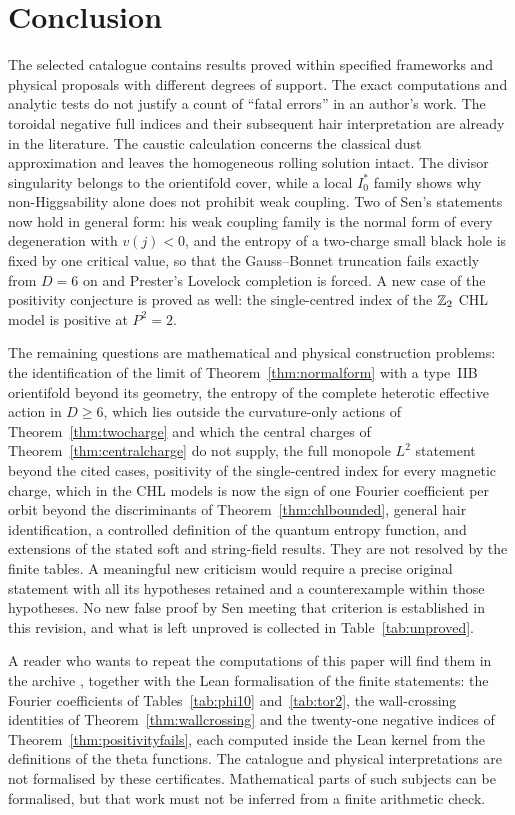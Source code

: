 \section{Conclusion}\label{sec:conclusion}

The selected catalogue contains results proved within specified frameworks and physical proposals with different degrees of support. The exact computations and analytic tests do not justify a count of ``fatal errors'' in an author's work. The toroidal negative full indices and their subsequent hair interpretation are already in the literature. The caustic calculation concerns the classical dust approximation and leaves the homogeneous rolling solution intact. The divisor singularity belongs to the orientifold cover, while a local $I_0^*$ family shows why non-Higgsability alone does not prohibit weak coupling. Two of Sen's statements now hold in general form: his weak coupling family is the normal form of every degeneration with $v(j)<0$, and the entropy of a two-charge small black hole is fixed by one critical value, so that the Gauss--Bonnet truncation fails exactly from $D=6$ on and Prester's Lovelock completion is forced. A new case of the positivity conjecture is proved as well: the single-centred index of the $\mathbb{Z}_2$ CHL model is positive at $P^2=2$.

The remaining questions are mathematical and physical construction problems: the identification of the limit of Theorem~\ref{thm:normalform} with a type~IIB orientifold beyond its geometry, the entropy of the complete heterotic effective action in $D\ge6$, which lies outside the curvature-only actions of Theorem~\ref{thm:twocharge} and which the central charges of Theorem~\ref{thm:centralcharge} do not supply, the full monopole $L^2$ statement beyond the cited cases, positivity of the single-centred index for every magnetic charge, which in the CHL models is now the sign of one Fourier coefficient per orbit beyond the discriminants of Theorem~\ref{thm:chlbounded}, general hair identification, a controlled definition of the quantum entropy function, and extensions of the stated soft and string-field results. They are not resolved by the finite tables. A meaningful new criticism would require a precise original statement with all its hypotheses retained and a counterexample within those hypotheses. No new false proof by Sen meeting that criterion is established in this revision, and what is left unproved is collected in Table~\ref{tab:unproved}.

A reader who wants to repeat the computations of this paper will find them in the archive \cite{Bha26}, together with the Lean formalisation of the finite statements: the Fourier coefficients of Tables~\ref{tab:phi10} and~\ref{tab:tor2}, the wall-crossing identities of Theorem~\ref{thm:wallcrossing} and the twenty-one negative indices of Theorem~\ref{thm:positivityfails}, each computed inside the Lean kernel from the definitions of the theta functions. The catalogue and physical interpretations are not formalised by these certificates. Mathematical parts of such subjects can be formalised, but that work must not be inferred from a finite arithmetic check.
